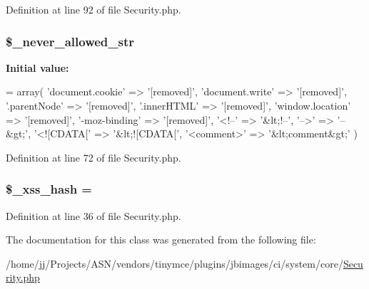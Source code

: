 Definition at line 92 of file Security.\+php.

\subsubsection[{\texorpdfstring{\$\+\_\+never\+\_\+allowed\+\_\+str}{$_never_allowed_str}}]{\setlength{\rightskip}{0pt plus 5cm}\$\+\_\+never\+\_\+allowed\+\_\+str\hspace{0.3cm}{\ttfamily [protected]}}\hypertarget{class_c_i___security_ab883fab930a1c4a926eaa501ab211823}{}\label{class_c_i___security_ab883fab930a1c4a926eaa501ab211823}
{\bfseries Initial value\+:}
\begin{DoxyCode}
= array(
        \textcolor{stringliteral}{'document.cookie'} => \textcolor{stringliteral}{'[removed]'},
        \textcolor{stringliteral}{'document.write'} => \textcolor{stringliteral}{'[removed]'},
        \textcolor{stringliteral}{'.parentNode'} => \textcolor{stringliteral}{'[removed]'},
        \textcolor{stringliteral}{'.innerHTML'} => \textcolor{stringliteral}{'[removed]'},
        \textcolor{stringliteral}{'window.location'} => \textcolor{stringliteral}{'[removed]'},
        \textcolor{stringliteral}{'-moz-binding'} => \textcolor{stringliteral}{'[removed]'},
        \textcolor{stringliteral}{'<!--'} => \textcolor{stringliteral}{'&lt;!--'},
        \textcolor{stringliteral}{'-->'} => \textcolor{stringliteral}{'--&gt;'},
        \textcolor{stringliteral}{'<![CDATA['} => \textcolor{stringliteral}{'&lt;![CDATA['},
        \textcolor{stringliteral}{'<comment>'} => \textcolor{stringliteral}{'&lt;comment&gt;'}
    )
\end{DoxyCode}


Definition at line 72 of file Security.\+php.

\subsubsection[{\texorpdfstring{\$\+\_\+xss\+\_\+hash}{$_xss_hash}}]{\setlength{\rightskip}{0pt plus 5cm}\$\+\_\+xss\+\_\+hash = \textquotesingle{}\textquotesingle{}\hspace{0.3cm}{\ttfamily [protected]}}\hypertarget{class_c_i___security_aca426a0e87199bfa36c7401a1d06a419}{}\label{class_c_i___security_aca426a0e87199bfa36c7401a1d06a419}


Definition at line 36 of file Security.\+php.



The documentation for this class was generated from the following file\+:\begin{DoxyCompactItemize}
\item 
/home/jj/\+Projects/\+A\+S\+N/vendors/tinymce/plugins/jbimages/ci/system/core/\hyperlink{_security_8php}{Security.\+php}\end{DoxyCompactItemize}

